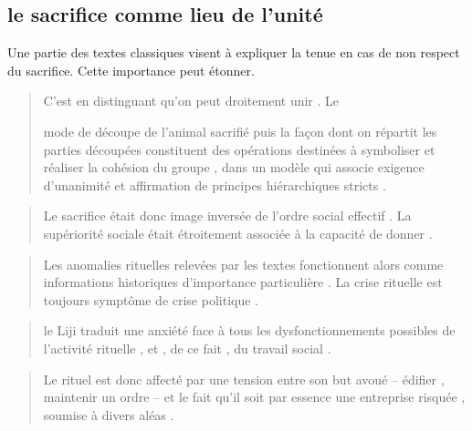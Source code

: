 \subsection{le sacrifice comme lieu de l'unité}
Une partie des textes classiques visent à expliquer la tenue en cas de non respect du sacrifice. Cette importance peut étonner.
 \begin{quote}

C'est en distinguant qu'on peut droitement unir .
Le

mode de découpe de l'animal sacrifié puis la façon dont on répartit les
parties découpées constituent des opérations destinées à symboliser et
réaliser la cohésion du groupe , dans un modèle qui associe exigence
d'unanimité et affirmation de principes hiérarchiques stricts . 

\end{quote}  \begin{quote}
Le sacrifice
était donc image inversée de l'ordre social effectif . La supériorité
sociale était étroitement associée à la capacité de donner .

\end{quote}  \begin{quote}

Les anomalies rituelles relevées par les textes fonctionnent alors comme
informations historiques d'importance particulière . La crise rituelle
est toujours symptôme de crise politique .

\end{quote}  \begin{quote}

le Liji traduit une anxiété face à tous les dysfonctionnements possibles
de l'activité rituelle , et , de ce fait , du travail social .

\end{quote}  \begin{quote}

Le rituel est donc affecté par une tension entre son but avoué -- édifier ,
maintenir un ordre -- et le fait qu'il soit par essence une entreprise
risquée , soumise à divers aléas .

\end{quote} 
